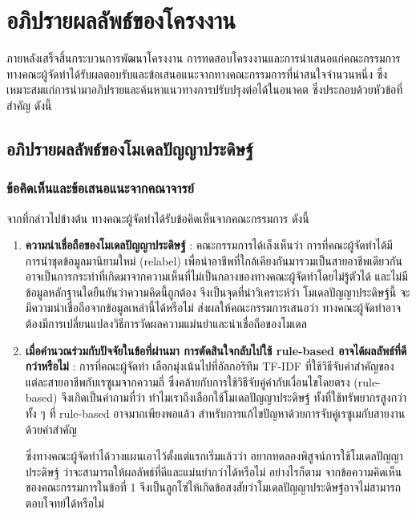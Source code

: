 \chapter{อภิปรายผลลัพธ์ของโครงงาน}

\par{
    ภายหลังเสร็จสิ้นกระบวนการพัฒนาโครงงาน การทดสอบโครงงานและการนำเสนอแก่คณะกรรมการ ทางคณะผู้จัดทำได้รับผลตอบรับและข้อเสนอแนะจากทางคณะกรรมการที่น่าสนใจจำนวนหนึ่ง ซึ่งเหมาะสมแก่การนำมาอภิปรายและค้นหาแนวทางการปรับปรุงต่อได้ในอนาคต ซึ่งประกอบด้วยหัวข้อที่สำคัญ ดังนี้
}

\section{อภิปรายผลลัพธ์ของโมเดลปัญญาประดิษฐ์}
\subsection{ข้อคิดเห็นและข้อเสนอแนะจากคณาจารย์}
จากที่กล่าวไปข้างต้น ทางคณะผู้จัดทำได้รับข้อคิดเห็นจากคณะกรรมการ ดังนี้

\begin{enumerate}
    \item \textbf{ความน่าเชื่อถือของโมเดลปัญญาประดิษฐ์} : คณะกรรมการได้เล็งเห็นว่า การที่คณะผู้จัดทำได้มีการนำชุดข้อมูลมานิยามใหม่ (relabel) เพื่อนำอาชีพที่ใกล้เคียงกันมารวมเป็นสายอาชีพเดียวกัน อาจเป็นการกระทำที่เกิดมาจากความเห็นที่ไม่เป็นกลางของทางคณะผู้จัดทำโดยไม่รู้ตัวได้ และไม่มีข้อมูลหลักฐานใดยืนยันว่าความคิดนี้ถูกต้อง จึงเป็นจุดที่น่าวิเคราะห์ว่า โมเดลปัญญาประดิษฐ์นี้ จะมีความน่าเชื่อถือจากข้อมูลเหล่านี้ได้หรือไม่ ส่งผลให้คณะกรรมการเสนอว่า ทางคณะผู้จัดทำอาจต้องมีการเปลี่ยนแปลงวิธีการวัดผลความแม่นยำและน่าเชื่อถือของโมเดล
    \item \textbf{เมื่อคำนวณร่วมกับปัจจัยในข้อที่ผ่านมา การตัดสินใจกลับไปใช้ rule-based อาจได้ผลลัพธ์ที่ดีกว่าหรือไม่} : 
    การที่คณะผู้จัดทำ เลือกมุ่งเน้นไปที่อัลกอริทึม TF-IDF ที่ใช้วิธีจับคำสำคัญของแต่ละสายอาชีพกับเรซูเมจากความถี่ ซึ่งคล้ายกับการใช้วิธีจับคู่คำกับเงื่อนไขโดยตรง (rule-based) จึงเกิดเป็นคำถามที่ว่า ทำไมเราถึงเลือกใช้โมเดลปัญญาประดิษฐ์ ทั้งที่ใช้ทรัพยากรสูงกว่า ทั้ง ๆ ที่ rule-based อาจมากเพียงพอแล้ว สำหรับการแก้ไขปัญหาด้วยการจับคู่เรซูเมกับสายงานด้วยคำสำคัญ
    
    ซึ่งทางคณะผู้จัดทำได้วางแผนเอาไว้ตั้งแต่แรกเริ่มแล้วว่า อยากทดลองพิสูจน์การใช้โมเดลปัญญาประดิษฐ์ ว่าจะสามารถให้ผลลัพธ์ที่ดีและแม่นยำกว่าได้หรือไม่ อย่างไรก็ตาม จากข้อความคิดเห็นของคณะกรรมการในข้อที่ 1 จึงเป็นลูกโซ่ให้เกิดข้อสงสัยว่าโมเดลปัญญาประดิษฐ์อาจไม่สามารถตอบโจทย์ได้หรือไม่
    
\end{enumerate}

